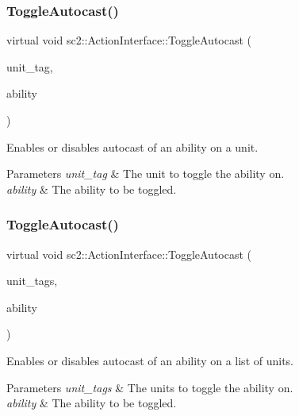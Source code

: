 \subsubsection{\texorpdfstring{Toggle\+Autocast()}{ToggleAutocast()}\hspace{0.1cm}{\footnotesize\ttfamily [1/2]}}
{\footnotesize\ttfamily virtual void sc2\+::\+Action\+Interface\+::\+Toggle\+Autocast (\begin{DoxyParamCaption}\item[{Tag}]{unit\+\_\+tag,  }\item[{\hyperlink{classsc2_1_1_s_c2_type}{Ability\+ID}}]{ability }\end{DoxyParamCaption})\hspace{0.3cm}{\ttfamily [pure virtual]}}

Enables or disables autocast of an ability on a unit. 
\begin{DoxyParams}{Parameters}
{\em unit\+\_\+tag} & The unit to toggle the ability on. \\
\hline
{\em ability} & The ability to be toggled. \\
\hline
\end{DoxyParams}
\mbox{\label{classsc2_1_1_action_interface_ab3990c306215b3cb8d5e62533f72db62}} 
\subsubsection{\texorpdfstring{Toggle\+Autocast()}{ToggleAutocast()}\hspace{0.1cm}{\footnotesize\ttfamily [2/2]}}
{\footnotesize\ttfamily virtual void sc2\+::\+Action\+Interface\+::\+Toggle\+Autocast (\begin{DoxyParamCaption}\item[{const std\+::vector$<$ Tag $>$ \&}]{unit\+\_\+tags,  }\item[{\hyperlink{classsc2_1_1_s_c2_type}{Ability\+ID}}]{ability }\end{DoxyParamCaption})\hspace{0.3cm}{\ttfamily [pure virtual]}}

Enables or disables autocast of an ability on a list of units. 
\begin{DoxyParams}{Parameters}
{\em unit\+\_\+tags} & The units to toggle the ability on. \\
\hline
{\em ability} & The ability to be toggled. \\
\hline
\end{DoxyParams}
\mbox{\label{classsc2_1_1_action_interface_add138c6ebe9b1fcbeae393c03b7fdeb9}} 
